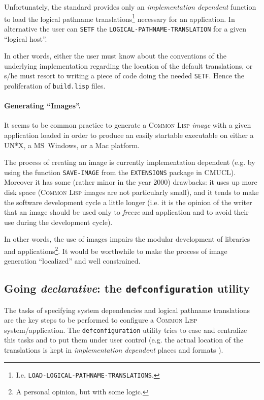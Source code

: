 \documentclass{article}
\newcommand{\CL}{\textsc{Common Lisp}}
\newcommand{\defconfiguration}{\texttt{defconfiguration}}
\newcommand{\code}[1]{\texttt{#1}}
\newcommand{\clobject}[1]{\texttt{\textit{#1}}} %
\begin{document}
Unfortunately, the standard provides only an \emph{implementation
dependent} function to load the logical pathname
translations\footnote{I.e. \code{LOAD-LOGICAL-PATHNAME-TRANSLATIONS}.}
necessary for an application. In alternative the user can \code{SETF}
the \code{LOGICAL-PATHNAME-TRANSLATION} for a given ``logical host''.

In other words, either the user must know about the conventions of the
underlying implementation regarding the location of the default
translations, or s/he must resort to writing a piece of code doing the
needed \code{SETF}.  Hence the proliferation of \texttt{build.lisp}
files.


\paragraph{Generating ``Images''.} It seems to be common practice to
generate a \CL{} \emph{image} with a given application loaded in order
to produce an easily startable executable on either a UN*X, a
MS~Windows, or a Mac platform.

The process of creating an image is currently implementation dependent
(e.g. by using the function \code{SAVE-IMAGE} from the
\code{EXTENSIONS} package in CMUCL).  Moreover it has some (rather
minor in the year 2000) drawbacks: it uses up more disk
space (\CL{} images are not particularly small), and it tends to make
the software development cycle a little longer (i.e. it is the opinion
of the writer that an image should be used only to \emph{freeze} and
application and to avoid their use during the development cycle).

In other words, the use of images impairs the modular development of
libraries and applications\footnote{A personal
opinion, but with some logic.}. It would be worthwhile to make the
process of image generation ``localized'' and well constrained.


\subsection{Going \emph{declarative}: the \defconfiguration{} utility}

The tasks of specifying system dependencies and logical pathname
translations are the key steps to be performed to configure a \CL{}
system/application.  The \defconfiguration{} utility tries to ease and
centralize this tasks and to put them under user control (e.g. the
actual location of the \clobject{} translations is kept in
\emph{implementation dependent} places and formats
\cite{pitman96:_common_lisp_hyper}).
\end{document}
